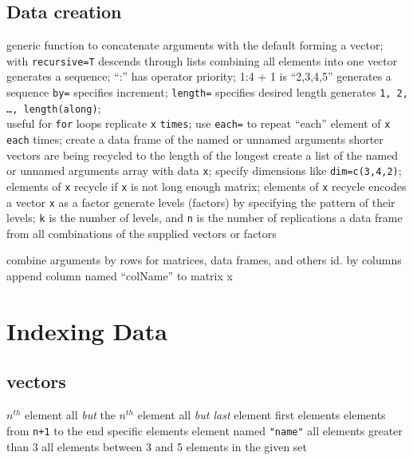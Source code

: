 \subsection{Data creation}{}
	{generic function to concatenate arguments with the default
forming a vector; with {\tt recursive=T} descends through lists combining all
elements into one vector}
	{generates a sequence; ``:'' has operator priority; 1:4 + 1 is
``2,3,4,5''}
	{generates a sequence {\tt by=} specifies increment; {\tt length=} specifies desired length}
	{generates {\tt 1, 2, \ldots, length(along)};\\useful for
{\tt for} loops}
	{replicate {\tt x} {\tt times}; use {\tt each=} to repeat ``each'' element of {\tt x} {\tt each} times;}
	{create a data frame of the named or unnamed arguments}
	{shorter vectors are being recycled to the length of the longest}
	{create a list of the named or unnamed arguments }
	{array with data {\tt x}; specify dimensions like {\tt dim=c(3,4,2)}; elements of {\tt x} recycle if {\tt x} is not long enough}
	{matrix; elements of {\tt x} recycle}
	{encodes a vector {\tt x} as a factor}
	{generate levels (factors) by specifying the pattern of their levels; {\tt k} is the number of levels, and {\tt n} is the number of replications}
	{a data frame from all combinations of the supplied vectors or factors}

	{combine arguments by rows for matrices, data frames, and
others}
	{id. by columns}
	{append column named ``colName'' to matrix x}


\section{Indexing Data}{}
\subsection{vectors}{}
	{ $ n^{th} $ element}
	{all {\it but} the $ n^{th} $ element}
	{all {\it but last} element}
	{first elements}
	{elements from {\tt n+1} to the end}
	{specific elements}
	{element named {\tt "name"}}
	{all elements greater than 3}
	{all elements between 3 and 5}
	{elements in the given set}

